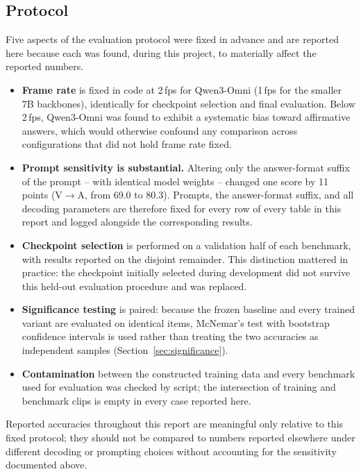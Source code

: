 \documentclass[11pt,a4paper,oneside]{article}
\begin{document}
\subsection{Protocol}
\label{sec:protocol}

Five aspects of the evaluation protocol were fixed in advance and are reported here because each was
found, during this project, to materially affect the reported numbers.

\begin{itemize}
\item \textbf{Frame rate} is fixed in code at 2\,fps for Qwen3-Omni (1\,fps for the smaller 7B
backbones), identically for checkpoint selection and final evaluation. Below 2\,fps, Qwen3-Omni was
found to exhibit a systematic bias toward affirmative answers, which would otherwise confound any
comparison across configurations that did not hold frame rate fixed.
\item \textbf{Prompt sensitivity is substantial.} Altering only the answer-format suffix of the
prompt -- with identical model weights -- changed one score by 11 points (V$\to$A, from 69.0 to
80.3). Prompts, the answer-format suffix, and all decoding parameters are therefore fixed for every
row of every table in this report and logged alongside the corresponding results.
\item \textbf{Checkpoint selection} is performed on a validation half of each benchmark, with results
reported on the disjoint remainder. This distinction mattered in practice: the checkpoint initially
selected during development did not survive this held-out evaluation procedure and was replaced.
\item \textbf{Significance testing} is paired: because the frozen baseline and every trained variant
are evaluated on identical items, McNemar's test with bootstrap confidence intervals is used rather
than treating the two accuracies as independent samples (Section~\ref{sec:significance}).
\item \textbf{Contamination} between the constructed training data and every benchmark used for
evaluation was checked by script; the intersection of training and benchmark clips is empty in every
case reported here.
\end{itemize}

Reported accuracies throughout this report are meaningful only relative to this fixed protocol; they
should not be compared to numbers reported elsewhere under different decoding or prompting choices
without accounting for the sensitivity documented above.
\end{document}
